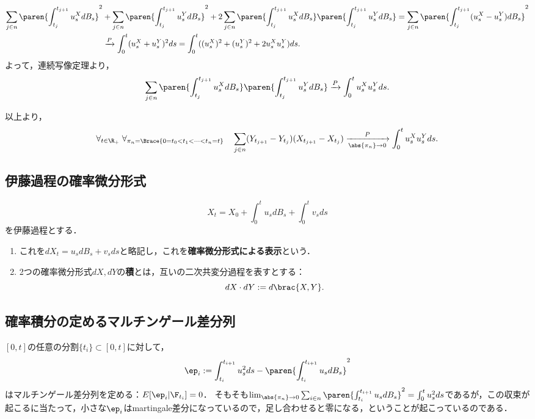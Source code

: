 \documentclass[uplatex,dvipdfmx]{jsreport}
\begin{document}
\begin{Proof}
\begin{enumerate}
        \begin{align*}
            \sum_{j\in n}\paren{\int^{t_{j+1}}_{t_j}u_s^XdB_s}^2&+\sum_{j\in n}\paren{\int^{t_{j+1}}_{t_j}u_s^YdB_s}^2+2\sum_{j\in n}\paren{\int^{t_{j+1}}_{t_j}u_s^XdB_s}\paren{\int^{t_{j+1}}_{t_j}u_s^YdB_s}=\sum_{j\in n}\paren{\int^{t_{j+1}}_{t_j}(u_s^X-u_s^Y)dB_s}^2\\
            &\xrightarrow{P}\int^t_0(u^X_s+u^Y_s)^2ds=\int^t_0((u_s^X)^2+(u^Y_s)^2+2u_s^Xu_s^Y)ds.
        \end{align*}
        よって，連続写像定理より，
        \[\sum_{j\in n}\paren{\int^{t_{j+1}}_{t_j}u_s^XdB_s}\paren{\int^{t_{j+1}}_{t_j}u_s^YdB_s}\xrightarrow{P}\int^t_0u_s^Xu_s^Yds.\]
    \end{enumerate}
    以上より，
    \[\forall_{t\in\R_+}\;\forall_{\pi_n=\Brace{0=t_0<t_1<\cdots<t_n=t}}\quad\sum_{j\in n}(Y_{t_{j+1}}-Y_{t_j})(X_{t_{j+1}}-X_{t_j})\xrightarrow[\abs{\pi_n}\to0]{P}\int^t_0u^X_su^Y_sds.\]
\end{Proof}

\subsection{伊藤過程の確率微分形式}

\begin{definition}
    \[X_t=X_0+\int^t_0u_sdB_s+\int^t_0v_sds\]
    を伊藤過程とする．
    \begin{enumerate}
        \item これを$dX_t=u_sdB_s+v_sds$と略記し，これを\textbf{確率微分形式による表示}という．
        \item 2つの確率微分形式$dX,dY$の\textbf{積}とは，互いの二次共変分過程を表すとする：
        \[dX\cdot dY:=d\brac{X,Y}.\]
    \end{enumerate}
\end{definition}

\subsection{確率積分の定めるマルチンゲール差分列}

\begin{tcolorbox}[colframe=ForestGreen, colback=ForestGreen!10!white,breakable,colbacktitle=ForestGreen!40!white,coltitle=black,fonttitle=\bfseries\sffamily,
title=]
    $[0,t]$の任意の分割$\{t_i\}\subset[0,t]$に対して，
    \[\ep_i:=\int^{t_{i+1}}_{t_i}u_s^2ds-\paren{\int^{t_{i+1}}_{t_i}u_sdB_s}^2\]
    はマルチンゲール差分列を定める：$E[\ep_i|\F_{t_i}]=0$．
    そもそも$\lim_{\abs{\pi_n}\to0}\sum_{i\in n}\paren{\int^{t_{i+1}}_{t_i}u_sdB_s}^2=\int^t_0u_s^2ds$であるが，この収束が起こるに当たって，小さな$\ep_i$はmartingale差分になっているので，足し合わせると零になる，ということが起こっているのである．
\end{tcolorbox}
\end{document}
